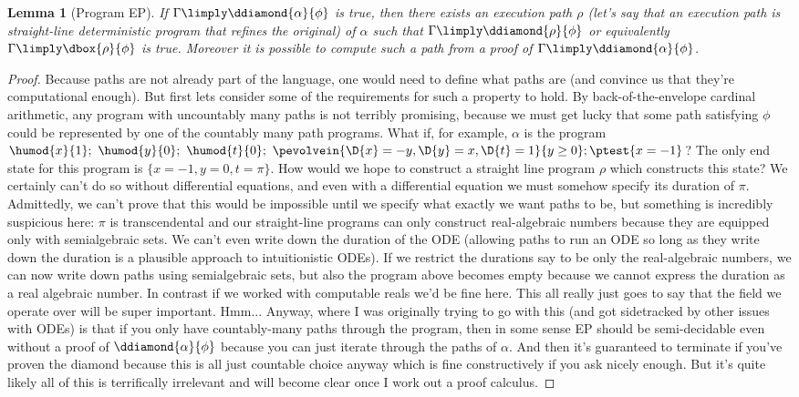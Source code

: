 \documentclass[12pt]{cmuthesis}
\newtheorem{lemma}[theorem]{Lemma}
\theoremstyle{definition}
\theoremstyle{remark}
\begin{document}
\begin{lemma}[Program EP]
If $\Gamma \limply \ddiamond{\alpha}{\phi}$ is true, then there exists an execution path $\rho$ (let's say that an execution path is straight-line deterministic program that refines the original) of $\alpha$ such that  
  $\Gamma \limply \ddiamond{\rho}{\phi}$ or equivalently $\Gamma \limply \dbox{\rho}{\phi}$ is true.
  Moreover it is possible to compute such a path from a proof of $\Gamma \limply \ddiamond{\alpha}{\phi}$.
\end{lemma}
\begin{proof}
  Because paths are not already part of the language, one would need to define what paths are (and convince us that they're computational enough).
  But first lets consider some of the requirements for such a property to hold.
  By back-of-the-envelope cardinal arithmetic, any program with uncountably many paths is not terribly promising, because we must get lucky that some path satisfying $\phi$ could be represented by one of the countably many path programs.
 What if, for example, $\alpha$ is the program $\humod{x}{1};~\humod{y}{0};~\humod{t}{0};~\pevolvein{\D{x}=-y,\D{y}=x,\D{t}=1}{y \geq 0};\ptest{x=-1}$?
 The only end state for this program is $\{x=-1,y=0,t=\pi\}$.
 How would we hope to construct a straight line program $\rho$ which constructs this state? 
 We certainly can't do so without differential equations, and even with a differential equation we must somehow specify its duration of $\pi$.
 Admittedly, we can't prove that this would be impossible until we specify what exactly we want paths to be, but something is incredibly suspicious here: $\pi$ is transcendental and our straight-line programs can only construct real-algebraic numbers because they are equipped only with semialgebraic sets.
 We can't even write down the duration of the ODE (allowing paths to run an ODE so long as they write down the duration is a plausible approach to intuitionistic ODEs).
 If we restrict the durations say to be only the real-algebraic numbers, we can now write down paths using semialgebraic sets, but also the program above becomes empty because we cannot express the duration as a real algebraic number.
 In contrast if we worked with computable reals we'd be fine here.
 This all really just goes to say that the field we operate over will be super important. Hmm...
 Anyway, where I was originally trying to go with this (and got sidetracked by other issues with ODEs) is that if you only have countably-many paths through the program, then in some sense EP should be semi-decidable even without a proof of $\ddiamond{\alpha}{\phi}$ because you can just iterate through the paths of $\alpha$.
 And then it's guaranteed to terminate if you've proven the diamond because this is all just countable choice anyway which is fine constructively if you ask nicely enough.
 But it's quite likely all of this is terrifically irrelevant and will become clear once I work out a proof calculus.
\end{proof}
\end{document}

